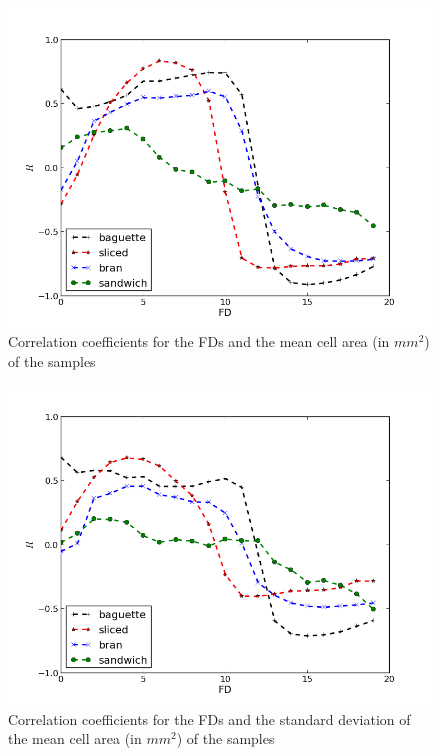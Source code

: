 \begin{figure}[htb]
\centering
\includegraphics[scale=0.38]{../images/mca}
\caption{Correlation coefficients for the FDs and the mean cell area (in $mm^{2}$) of the samples}
\label{fig:corrMCA}
\end{figure}

\begin{figure}[htb]
\centering
\includegraphics[scale=0.38]{../images/mcastdev}
\caption{Correlation coefficients for the FDs and the standard deviation of the mean cell area (in $mm^{2}$) of the samples}
\label{fig:corrMCAstdev}
\end{figure}


